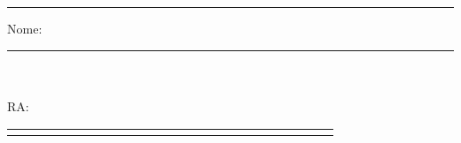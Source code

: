 \documentclass[14pt]{report}
\begin{document}


\rule[2ex]{\textwidth}{2pt}

Nome:\hspace{0.5cm}\rule[-1ex]{11.6cm}{1pt}\\\\

RA:\hspace{0.8cm} \begin{Large}\blacksquare\end{Large} \hspace{0.5cm}
\begin{tabular}{|p{0.5cm}|p{0.5cm}|p{0.5cm}|p{0.5cm}|p{0.5cm}|p{0.5cm}|p{0.5cm}|p{0.5cm}|p{0.5cm}|p{0.5cm}|p{0.5cm}|}
\hline
&&&&&&&&&&&
&&&&&&&&&&&
\hline
\end{tabular}
\hspace{0.5cm} \begin{Large}\blacksquare\end{Large}
\\\\
\end{document}
